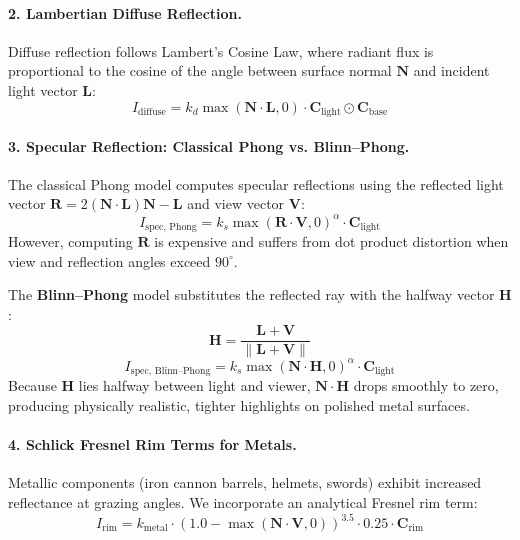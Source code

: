 \documentclass[11pt,a4paper]{article}
\begin{document}
\paragraph{2. Lambertian Diffuse Reflection.}
Diffuse reflection follows Lambert's Cosine Law, where radiant flux is proportional to the cosine of the angle between surface normal $\mathbf{N}$ and incident light vector $\mathbf{L}$:
\begin{equation}
  I_{\text{diffuse}} = k_d \max(\mathbf{N} \cdot \mathbf{L}, 0) \cdot \mathbf{C}_{\text{light}} \odot \mathbf{C}_{\text{base}}
\end{equation}

\paragraph{3. Specular Reflection: Classical Phong vs. Blinn--Phong.}
The classical Phong model computes specular reflections using the reflected light vector $\mathbf{R} = 2(\mathbf{N} \cdot \mathbf{L})\mathbf{N} - \mathbf{L}$ and view vector $\mathbf{V}$:
\begin{equation}
  I_{\text{spec, Phong}} = k_s \max(\mathbf{R} \cdot \mathbf{V}, 0)^\alpha \cdot \mathbf{C}_{\text{light}}
\end{equation}
However, computing $\mathbf{R}$ is expensive and suffers from dot product distortion when view and reflection angles exceed $90^\circ$.

The \textbf{Blinn--Phong} model substitutes the reflected ray with the halfway vector $\mathbf{H}$:
\begin{equation}
  \mathbf{H} = \frac{\mathbf{L} + \mathbf{V}}{\|\mathbf{L} + \mathbf{V}\|}
\end{equation}
\begin{equation}
  I_{\text{spec, Blinn--Phong}} = k_s \max(\mathbf{N} \cdot \mathbf{H}, 0)^\alpha \cdot \mathbf{C}_{\text{light}}
\end{equation}
Because $\mathbf{H}$ lies halfway between light and viewer, $\mathbf{N} \cdot \mathbf{H}$ drops smoothly to zero, producing physically realistic, tighter highlights on polished metal surfaces.

\paragraph{4. Schlick Fresnel Rim Terms for Metals.}
Metallic components (iron cannon barrels, helmets, swords) exhibit increased reflectance at grazing angles. We incorporate an analytical Fresnel rim term:
\begin{equation}
  I_{\text{rim}} = k_{\text{metal}} \cdot (1.0 - \max(\mathbf{N} \cdot \mathbf{V}, 0))^{3.5} \cdot 0.25 \cdot \mathbf{C}_{\text{rim}}
\end{equation}
\end{document}
